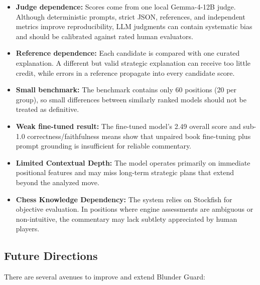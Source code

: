 \documentclass[sigconf,nonacm]{acmart}
\begin{document}
\begin{itemize}
    \item \textbf{Judge dependence:} Scores come from one local Gemma-4-12B judge. Although deterministic prompts, strict JSON, references, and independent metrics improve reproducibility, LLM judgments can contain systematic bias and should be calibrated against rated human evaluators.
    \item \textbf{Reference dependence:} Each candidate is compared with one curated explanation. A different but valid strategic explanation can receive too little credit, while errors in a reference propagate into every candidate score.
    \item \textbf{Small benchmark:} The benchmark contains only 60 positions (20 per group), so small differences between similarly ranked models should not be treated as definitive.
    \item \textbf{Weak fine-tuned result:} The fine-tuned model's 2.49 overall score and sub-1.0 correctness/faithfulness means show that unpaired book fine-tuning plus prompt grounding is insufficient for reliable commentary.
    \item \textbf{Limited Contextual Depth:} The model operates primarily on immediate positional features and may miss long-term strategic plans that extend beyond the analyzed move.
    \item \textbf{Chess Knowledge Dependency:} The system relies on Stockfish for objective evaluation. In positions where engine assessments are ambiguous or non-intuitive, the commentary may lack subtlety appreciated by human players.
\end{itemize}

\subsection{Future Directions}

There are several avenues to improve and extend Blunder Guard:
\end{document}
